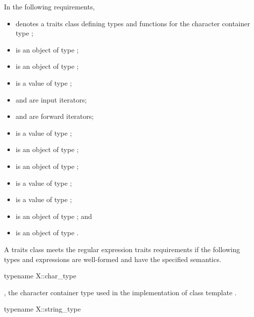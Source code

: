 \pnum
{}%
%
%
%
In the following requirements,
\begin{itemize}
\item
{} denotes a traits class defining types and functions
for the character container type ;
\item
{} is an object of type ;
\item
{} is an object of type ;
\item
{} is a value of type ;
\item
{} and  are input iterators;
\item
{} and  are forward iterators;
\item
{} is a value of type ;
\item
{} is an object of type ;
\item
{} is an object of type ;
\item
{} is a value of  type ;
\item
{} is a value of type ;
\item
{} is an object of type ; and
\item
{} is an object of type .
\end{itemize}

\pnum
A traits class  meets the regular expression traits requirements
if the following types and expressions are well-formed and have the specified
semantics.

\begin{itemdecl}
typename X::char_type
\end{itemdecl}

\begin{itemdescr}
\pnum
\result
{},
the character container type used in the implementation of class
template .
\end{itemdescr}

\begin{itemdecl}
typename X::string_type
\end{itemdecl}

\begin{itemdescr}
\pnum
\result
{}
\end{itemdescr}


